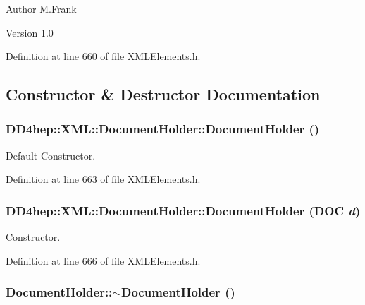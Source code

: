 \begin{DoxyAuthor}{Author}
M.Frank 
\end{DoxyAuthor}
\begin{DoxyVersion}{Version}
1.0 
\end{DoxyVersion}


Definition at line 660 of file XMLElements.h.

\subsection{Constructor \& Destructor Documentation}
\hypertarget{class_d_d4hep_1_1_x_m_l_1_1_document_holder_abeb4692ba8b187e1b65921f3f53a0b64}{
\subsubsection[{DocumentHolder}]{\setlength{\rightskip}{0pt plus 5cm}DD4hep::XML::DocumentHolder::DocumentHolder ()}}
\label{class_d_d4hep_1_1_x_m_l_1_1_document_holder_abeb4692ba8b187e1b65921f3f53a0b64}


Default Constructor. 

Definition at line 663 of file XMLElements.h.\hypertarget{class_d_d4hep_1_1_x_m_l_1_1_document_holder_a8b64dfa073e0343d39b882cb24ce3ffa}{
\subsubsection[{DocumentHolder}]{\setlength{\rightskip}{0pt plus 5cm}DD4hep::XML::DocumentHolder::DocumentHolder ({\bf DOC} {\em d})}}
\label{class_d_d4hep_1_1_x_m_l_1_1_document_holder_a8b64dfa073e0343d39b882cb24ce3ffa}


Constructor. 

Definition at line 666 of file XMLElements.h.\hypertarget{class_d_d4hep_1_1_x_m_l_1_1_document_holder_a3620e4a3c05901eaefe31ea2e7fff5f5}{
\subsubsection[{$\sim$DocumentHolder}]{\setlength{\rightskip}{0pt plus 5cm}DocumentHolder::$\sim$DocumentHolder ()}}
\label{class_d_d4hep_1_1_x_m_l_1_1_document_holder_a3620e4a3c05901eaefe31ea2e7fff5f5}


